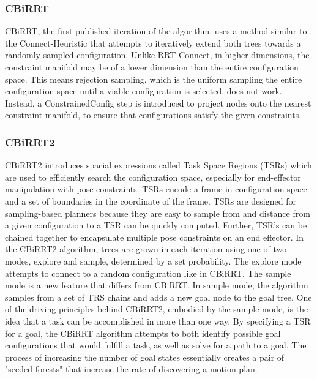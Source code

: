 \documentclass[12pt]{article}
\begin{document}
        \subsubsection{CBiRRT} 
            CBiRRT, the first published iteration of the algorithm, uses a method similar to the Connect-Heuristic that attempts to iteratively extend both trees towards a randomly sampled configuration. Unlike RRT-Connect, in higher dimensions, the constraint manifold may be of a lower dimension than the entire configuration space. This means rejection sampling, which is the uniform sampling the entire configuration space until a viable configuration is selected, does not work. Instead, a ConstrainedConfig step is introduced to project nodes onto the nearest constraint manifold, to ensure that configurations satisfy the given constraints. \cite{berenson_manipulation_2009}
        
        \subsubsection{CBiRRT2} 
            CBiRRT2 introduces spacial expressions called Task Space Regions (TSRs) which are used to efficiently search the configuration space, especially for end-effector manipulation with pose constraints. TSRs encode a frame in configuration space and a set of boundaries in the coordinate of the frame. TSRs are designed for sampling-based planners because they are easy to sample from and distance from a given configuration to a TSR can be quickly computed. Further, TSR's can be chained together to encapsulate multiple pose constraints on an end effector. In the CBiRRT2 algorithm, trees are grown in each iteration using one of two modes, explore and sample, determined by a set probability. The explore mode attempts to connect to a random configuration like in CBiRRT. The sample mode is a new feature that differs from CBiRRT. In sample mode, the algorithm samples from a set of TRS chains and adds a new goal node to the goal tree. One of the driving principles behind CBiRRT2, embodied by the sample mode, is the idea that a task can be accomplished in more than one way. By specifying a TSR for a goal, the CBiRRT algorithm attempts to both identify possible goal configurations that would fulfill a task, as well as solve for a path to a goal. The process of increasing the number of goal states essentially creates a pair of "seeded forests" that increase the rate of discovering a motion plan. \cite{berenson_pose-constrained_2009} 
\end{document}

